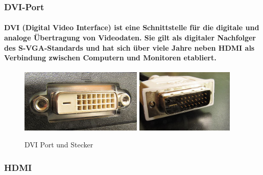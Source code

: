 \documentclass[a4paper]{article}
\begin{document}
    \subsubsection{\color{codegreen}DVI-Port}
    \paragraph{\color{codegreen}DVI (Digital Video Interface) ist eine Schnittstelle für die digitale und analoge Übertragung von Videodaten. Sie gilt als digitaler Nachfolger des S-VGA-Standards und hat sich über viele Jahre neben HDMI als Verbindung zwischen Computern und Monitoren etabliert.}
    \begin{center}
        \begin{figure}[H]
            \centering
            \includegraphics[height=3cm]{media/dvi}
            \includegraphics[height=3cm]{media/DVI-Stecker}
            \captionsetup{labelformat=empty}
            \caption{DVI Port und Stecker}
            \label{fig:dvi}
        \end{figure}
    \end{center}
    \subsubsection{\color{codegreen}HDMI}
\end{document}
